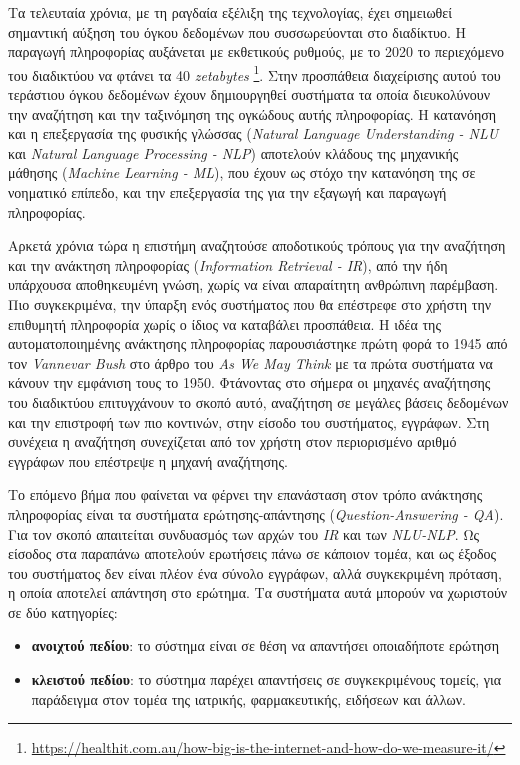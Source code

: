 Τα τελευταία χρόνια, με τη ραγδαία εξέλιξη της τεχνολογίας, έχει σημειωθεί σημαντική αύξηση του όγκου δεδομένων που συσσωρεύονται στο διαδίκτυο. Η παραγωγή πληροφορίας αυξάνεται με εκθετικούς ρυθμούς, με το 2020 το περιεχόμενο του διαδικτύου να φτάνει τα 40 \emph{zetabytes} \footnote{\url{https://healthit.com.au/how-big-is-the-internet-and-how-do-we-measure-it/}}. Στην προσπάθεια διαχείρισης αυτού του τεράστιου όγκου δεδομένων έχουν δημιουργηθεί συστήματα τα οποία διευκολύνουν την αναζήτηση και την ταξινόμηση της ογκώδους αυτής πληροφορίας. Η κατανόηση και η  επεξεργασία της φυσικής γλώσσας (\emph{Natural Language Understanding - NLU} και \emph{Natural Language Processing - NLP}) αποτελούν κλάδους της μηχανικής μάθησης (\emph{Machine Learning - ML}), που έχουν ως στόχο την κατανόηση της σε νοηματικό επίπεδο, και την επεξεργασία της για την εξαγωγή και παραγωγή πληροφορίας.

Αρκετά χρόνια τώρα η επιστήμη αναζητούσε αποδοτικούς τρόπους για την αναζήτηση και την ανάκτηση πληροφορίας (\emph{Information Retrieval - IR}), από την ήδη υπάρχουσα αποθηκευμένη γνώση, χωρίς να είναι απαραίτητη ανθρώπινη παρέμβαση. Πιο συγκεκριμένα, την ύπαρξη ενός συστήματος που θα επέστρεφε στο χρήστη την επιθυμητή πληροφορία χωρίς ο ίδιος να καταβάλει προσπάθεια. Η ιδέα της αυτοματοποιημένης ανάκτησης πληροφορίας παρουσιάστηκε πρώτη φορά το 1945 από τον \emph{Vannevar Bush} στο άρθρο του \emph{As We May Think} \cite{bush1945} με τα πρώτα συστήματα να κάνουν την εμφάνιση τους το 1950. Φτάνοντας στο σήμερα οι μηχανές αναζήτησης του διαδικτύου επιτυγχάνουν το σκοπό αυτό, αναζήτηση σε μεγάλες βάσεις δεδομένων και την επιστροφή των πιο κοντινών, στην είσοδο του συστήματος, εγγράφων. Στη συνέχεια η αναζήτηση συνεχίζεται από τον χρήστη στον περιορισμένο αριθμό εγγράφων που επέστρεψε η μηχανή αναζήτησης.

Το επόμενο βήμα που φαίνεται να φέρνει την επανάσταση στον τρόπο ανάκτησης πληροφορίας είναι τα συστήματα ερώτησης-απάντησης (\emph{Question-Answering - QA}). Για τον σκοπό απαιτείται συνδυασμός των αρχών του \emph{IR} και των \emph{NLU-NLP}. Ως είσοδος στα παραπάνω αποτελούν ερωτήσεις πάνω σε κάποιον τομέα, και ως έξοδος του συστήματος δεν είναι πλέον ένα σύνολο εγγράφων, αλλά συγκεκριμένη πρόταση, η οποία αποτελεί απάντηση στο ερώτημα. Τα συστήματα αυτά μπορούν να χωριστούν σε δύο κατηγορίες: 
\begin{itemize}
    \item \textbf{ανοιχτού πεδίου}: το σύστημα είναι σε θέση να απαντήσει οποιαδήποτε ερώτηση
    \item \textbf{κλειστού πεδίου}: το σύστημα παρέχει απαντήσεις σε συγκεκριμένους τομείς, για παράδειγμα στον τομέα της ιατρικής, φαρμακευτικής, ειδήσεων και άλλων.
\end{itemize}